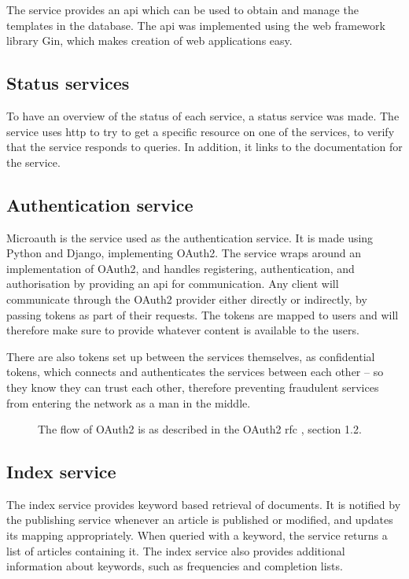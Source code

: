 The service provides an \acrshort{api} which can be used to obtain and manage the templates in the database. The \acrshort{api} was implemented using the web framework library Gin, which makes creation of web applications easy.

\subsection{Status services}
To have an overview of the status of each service, a status service was made. The service uses \acrshort{http} to try to get a specific resource on one of the services, to verify that the service responds to queries. In addition, it links to the documentation for the service.

\subsection{Authentication service} \label{subsec:authServiceArchitecture}
Microauth is the service used as the authentication service. It is made using Python and Django, implementing OAuth2. The service wraps around an implementation of OAuth2, and handles registering, authentication, and authorisation by providing an \acrshort{api} for communication. Any client will communicate through the OAuth2 provider either directly or indirectly, by passing tokens as part of their requests. The tokens are mapped to users and will therefore make sure to provide whatever content is available to the users. 

There are also tokens set up between the services themselves, as confidential tokens, which connects and authenticates the services between each other -- so they know they can trust each other, therefore preventing fraudulent services from entering the network as a man in the middle.

\begin{figure}[H]
    \centering
    
    \caption{The flow of OAuth2 is as described in the OAuth2 \acrshort{rfc} \citep{oauth2RFC}, section 1.2. }\label{fig:oauth-flow}
\end{figure}

\subsection{Index service}
The index service provides keyword based retrieval of documents. It is notified by the publishing service whenever an article is published or modified, and updates its mapping appropriately. When queried with a keyword, the service returns a list of articles containing it. The index service also provides additional information about keywords, such as frequencies and completion lists. 

